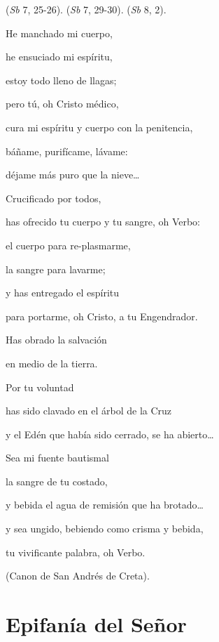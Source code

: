 \begin{body}
\begin{body}
 (\emph{Sb} 7, 25-26).  (\emph{Sb} 7, 29-30).  (\emph{Sb} 8, 2).

He manchado mi cuerpo,

he ensuciado mi espíritu,

estoy todo lleno de llagas;

pero tú, oh Cristo médico,

cura mi espíritu y cuerpo con la penitencia,

báñame, purifícame, lávame:

déjame más puro que la nieve\ldots{}

Crucificado por todos,

has ofrecido tu cuerpo y tu sangre, oh Verbo:

el cuerpo para re-plasmarme,

la sangre para lavarme;

y has entregado el espíritu

para portarme, oh Cristo, a tu Engendrador.

Has obrado la salvación

en medio de la tierra.

Por tu voluntad

has sido clavado en el árbol de la Cruz

y el Edén que había sido cerrado, se ha abierto\ldots{}

Sea mi fuente bautismal

la sangre de tu costado,

y bebida el agua de remisión que ha brotado\ldots{}

y sea ungido, bebiendo como crisma y bebida,

tu vivificante palabra, oh Verbo.

(Canon de San Andrés de Creta).

\chapter{Epifanía del Señor}


\end{body}
\end{body}
